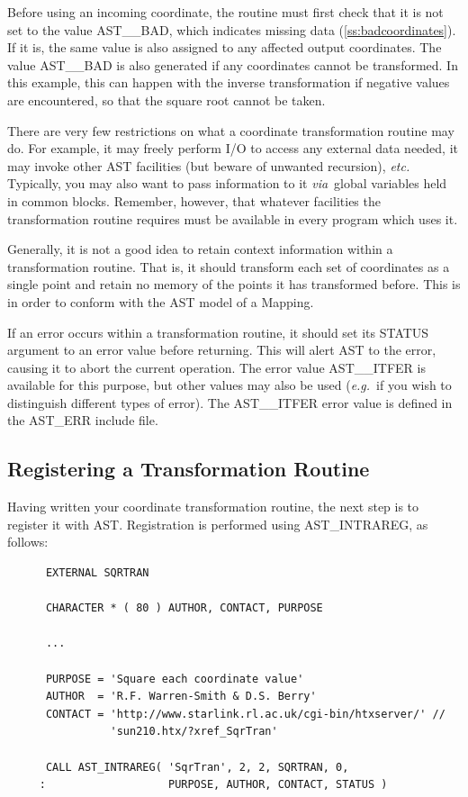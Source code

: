 \documentclass[twoside,11pt]{article}
\newcommand{\htmlref}[2]{#1}
\newcommand{\secref}[1]{\S\ref{#1}}
\renewcommand{\secref}[1]{\ref{#1}}
\begin{document}
Before using an incoming coordinate, the routine must first check that
it is not set to the value AST\_\_BAD, which indicates missing data
(\secref{ss:badcoordinates}). If it is, the same value is also
assigned to any affected output coordinates. The value AST\_\_BAD is
also generated if any coordinates cannot be transformed. In this
example, this can happen with the inverse transformation if negative
values are encountered, so that the square root cannot be taken.

There are very few restrictions on what a coordinate transformation
routine may do. For example, it may freely perform I/O to access any
external data needed, it may invoke other AST facilities (but beware
of unwanted recursion), {\em{etc.}} Typically, you may also want to
pass information to it {\em{via}}\ global variables held in common
blocks.  Remember, however, that whatever facilities the
transformation routine requires must be available in every program
which uses it.

Generally, it is not a good idea to retain context information within
a transformation routine. That is, it should transform each set of
coordinates as a single point and retain no memory of the points it
has transformed before. This is in order to conform with the AST model
of a \htmlref{Mapping}{Mapping}.

If an error occurs within a transformation routine, it should set its
STATUS argument to an error value before returning. This will alert
AST to the error, causing it to abort the current operation. The error
value AST\_\_ITFER is available for this purpose, but other values may
also be used ({\em{e.g.}}\ if you wish to distinguish different types
of error). The AST\_\_ITFER error value is defined in the AST\_ERR
include file.

\subsection{\label{ss:registeringintramaps}Registering a Transformation Routine}

Having written your coordinate transformation routine, the next step
is to register it with AST. Registration is performed using
\htmlref{AST\_INTRAREG}{AST_INTRAREG}, as follows:

\small
\begin{verbatim}
      EXTERNAL SQRTRAN

      CHARACTER * ( 80 ) AUTHOR, CONTACT, PURPOSE

      ...

      PURPOSE = 'Square each coordinate value'
      AUTHOR  = 'R.F. Warren-Smith & D.S. Berry'
      CONTACT = 'http://www.starlink.rl.ac.uk/cgi-bin/htxserver/' //
                'sun210.htx/?xref_SqrTran'

      CALL AST_INTRAREG( 'SqrTran', 2, 2, SQRTRAN, 0,
     :                   PURPOSE, AUTHOR, CONTACT, STATUS )
\end{verbatim}
\normalsize
\end{document}
